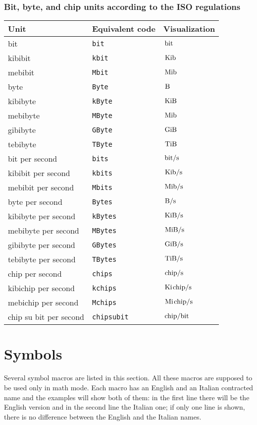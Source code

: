 \documentclass[11pt,a4paper,openany]{book}
\newcommand*{\cs}[1]{\texttt{\char92#1}}
\begin{document}
\subsubsection{Bit, byte, and chip units according to the ISO regulations}
\begin{center}
\begin{tabular}{lll}
\toprule
Unit & Equivalent code & Visualization\\
\midrule
bit & \cs{bit} & $\,\mathrm{bit}$\\
kibibit & \cs{kbit} & $\,\mathrm{Kib}$ \\
mebibit & \cs{Mbit} & $\,\mathrm{Mib}$\\
byte & \cs{Byte} & $\,\mathrm{B}$\\
kibibyte & \cs{kByte} & $\,\mathrm{KiB}$ \\
mebibyte & \cs{MByte} & $\,\mathrm{Mib}$\\
gibibyte & \cs{GByte}	&	$\,\mathrm{GiB}$	\\
tebibyte & \cs{TByte}  & $\,\mathrm{TiB}$ \\
bit per second & \cs{bits} & $\,\mathrm{bit/s}$\\
kibibit per second & \cs{kbits} & $\,\mathrm{Kib/s}$ \\
mebibit per second & \cs{Mbits} & $\,\mathrm{Mib/s}$\\
byte per second & \cs{Bytes} & $\,\mathrm{B/s}$\\
kibibyte per second & \cs{kBytes} & $\,\mathrm{KiB/s}$ \\
mebibyte per second & \cs{MBytes} & $\,\mathrm{MiB/s}$\\
gibibyte per second & \cs{GBytes}	& $\,\mathrm{GiB/s}$\\
tebibyte per second & \cs{TBytes}	& $\,\mathrm{TiB/s}$\\
chip per second & \cs{chips} & $\,\mathrm{chip/s}$\\
kibichip per second & \cs{kchips} & $\,\mathrm{Ki\mkern2mu chip/s}$ \\
mebichip per second & \cs{Mchips} & $\,\mathrm{Mi\mkern2mu chip/s}$\\
chip su bit per second & \cs{chipsubit} & $\,\mathrm{chip/bit}$\\
\bottomrule
\end{tabular}
\end{center}
\section{Symbols}\label{sec:simboli}
Several  symbol macros are listed in this section. 
All these macros are supposed to be used only in math mode. Each macro has an English and an Italian contracted name and the examples will show both of them: in the first line there will be the English version and in the second line the Italian one; if only one line is shown, there is no difference between the English and the Italian names.
\end{document}
